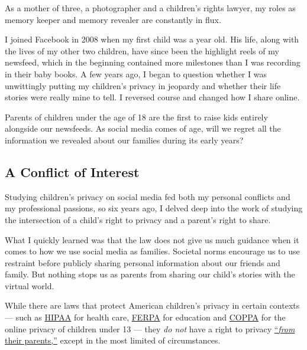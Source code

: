 As a mother of three, a photographer and a children's rights lawyer, my
roles as memory keeper and memory revealer are constantly in flux.

I joined Facebook in 2008 when my first child was a year old. His life,
along with the lives of my other two children, have since been the
highlight reels of my newsfeed, which in the beginning contained more
milestones than I was recording in their baby books. A few years ago, I
began to question whether I was unwittingly putting my children's
privacy in jeopardy and whether their life stories were really mine to
tell. I reversed course and changed how I share online.

Parents of children under the age of 18 are the first to raise kids
entirely alongside our newsfeeds. As social media comes of age, will we
regret all the information we revealed about our families during its
early years?

\hypertarget{a-conflict-of-interest}{%
\subsection{A Conflict of Interest}\label{a-conflict-of-interest}}

Studying children's privacy on social media fed both my personal
conflicts and my professional passions, so six years ago, I delved deep
into the work of studying the intersection of a child's right to privacy
and a parent's right to share.

What I quickly learned was that the law does not give us much guidance
when it comes to how we use social media as families. Societal norms
encour­age us to use restraint before publicly sharing personal
informa­tion about our friends and family. But nothing stops us as
parents from sharing our child's stories with the virtual world.

While there are laws that protect American children's privacy in certain
contexts --- such as \href{https://www.hhs.gov/hipaa/index.html}{HIPAA}
for health care,
\href{https://www2.ed.gov/policy/gen/guid/fpco/ferpa/index.html}{FERPA}
for education and
\href{https://www.ftc.gov/enforcement/rules/rulemaking-regulatory-reform-proceedings/childrens-online-privacy-protection-rule}{COPPA}
for the online privacy of children under 13 --- they \emph{do not} have
a right to privacy
\href{https://papers.ssrn.com/sol3/papers.cfm?abstract_id=1746540}{``}\href{https://papers.ssrn.com/sol3/papers.cfm?abstract_id=1746540}{\emph{from}}
\href{https://papers.ssrn.com/sol3/papers.cfm?abstract_id=1746540}{their
parents,''} except in the most limited of circumstances.

